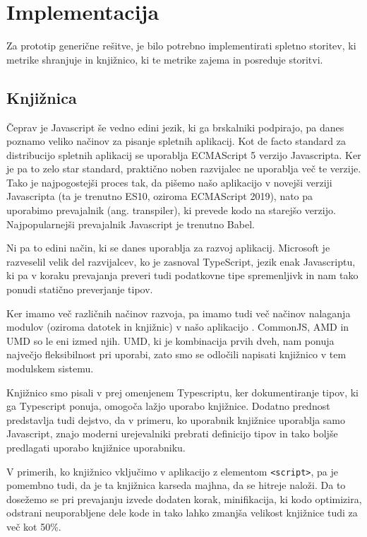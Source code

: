 \documentclass[a4paper, 12pt]{book}
\begin{document}
\section{Implementacija}
\label{ch3:sec2}

Za prototip generične rešitve, je bilo potrebno implementirati spletno storitev, ki metrike shranjuje in knjižnico, ki te metrike zajema in posreduje storitvi.

\subsection{Knjižnica}
\label{ch3:sec2:sub1}

Čeprav je Javascript še vedno edini jezik, ki ga brskalniki podpirajo, pa danes poznamo veliko načinov za pisanje spletnih aplikacij. Kot de facto standard za distribucijo spletnih aplikacij se uporablja ECMAScript 5 verzijo Javascripta. Ker je pa to zelo star standard, praktično noben razvijalec ne uporablja več te verzije. Tako je najpogostejši proces tak, da pišemo našo aplikacijo v novejši verziji Javascripta (ta je trenutno ES10, oziroma ECMAScript 2019), nato pa uporabimo prevajalnik (ang. transpiler), ki prevede kodo na starejšo verzijo. Najpopularnejši prevajalnik Javascript je trenutno Babel.

Ni pa to edini način, ki se danes uporablja za razvoj aplikacij. Microsoft je razveselil velik del razvijalcev, ko je zasnoval TypeScript, jezik enak Javascriptu, ki pa v koraku prevajanja preveri tudi podatkovne tipe spremenljivk in nam tako ponudi statično preverjanje tipov.

Ker imamo več različnih načinov razvoja, pa imamo tudi več načinov nalaganja modulov (oziroma datotek in knjižnic) v našo aplikacijo \cite{js_modules}. CommonJS, AMD in UMD so le eni izmed njih. UMD, ki je kombinacija prvih dveh, nam ponuja največjo fleksibilnost pri uporabi, zato smo se odločili napisati knjižnico v tem modulskem sistemu.

Knjižnico smo pisali v prej omenjenem Typescriptu, ker dokumentiranje tipov, ki ga Typescript ponuja, omogoča lažjo uporabo knjižnice. Dodatno prednost predstavlja tudi dejstvo, da v primeru, ko uporabnik knjižnice uporablja samo Javascript, znajo moderni urejevalniki prebrati definicijo tipov in tako boljše predlagati uporabo knjižnice uporabniku.

V primerih, ko knjižnico vključimo v aplikacijo z elementom \verb|<script>|, pa je pomembno tudi, da je ta knjižnica karseda majhna, da se hitreje naloži. Da to dosežemo se pri prevajanju izvede dodaten korak, minifikacija, ki kodo optimizira, odstrani neuporabljene dele kode in tako lahko zmanjša velikost knjižnice tudi za več kot 50\%.
\end{document}
